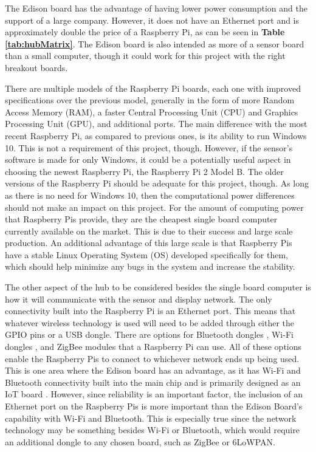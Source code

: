 \documentclass[PPFS.tex]{template/subfiles}
\begin{document}
The Edison board has the advantage of having lower power consumption and the support of a large company. However, it does not have an Ethernet port and is approximately double the price of a Raspberry Pi, as can be seen in \textbf{Table \ref{tab:hubMatrix}}. The Edison board is also intended as more of a sensor board than a small computer, though it could work for this project with the right breakout boards. \cite{Intel}

There are multiple models of the Raspberry Pi boards, each one with improved specifications over the previous model, generally in the form of more Random Access Memory (RAM), a faster Central Processing Unit (CPU) and Graphics Processing Unit (GPU), and additional ports. The main difference with the most recent Raspberry Pi, as compared to previous ones, is its ability to run Windows 10. This is not a requirement of this project, though. However, if the sensor's software is made for only Windows, it could be a potentially useful aspect in choosing the newest Raspberry Pi, the Raspberry Pi 2 Model B. The older versions of the Raspberry Pi should be adequate for this project, though. As long as there is no need for Windows 10, then the computational power differences should not make an impact on this project. For the amount of computing power that Raspberry Pis provide, they are the cheapest single board computer currently available on the market. This is due to their success and large scale production. An additional advantage of this large scale is that Raspberry Pis have a stable Linux Operating System (OS) developed specifically for them, which should help minimize any bugs in the system and increase the stability. \cite{RaspberryPi}

The other aspect of the hub to be considered besides the single board computer is how it will communicate with the sensor and display network. The only connectivity built into the Raspberry Pi is an Ethernet port. This means that whatever wireless technology is used will need to be added through either the GPIO pins or a USB dongle. There are options for Bluetooth dongles \cite{AdaFruit}, Wi-Fi dongles \cite{RaspberryPi}, and ZigBee modules \cite{Zigbee} that a Raspberry Pi can use. All of these options enable the Raspberry Pis to connect to whichever network ends up being used. This is one area where the Edison board has an advantage, as it has Wi-Fi and Bluetooth connectivity built into the main chip and is primarily designed as an IoT board \cite{Intel}. However, since reliability is an important factor, the inclusion of an Ethernet port on the Raspberry Pis is more important than the Edison Board's capability with Wi-Fi and Bluetooth. This is especially true since the network technology may be something besides Wi-Fi or Bluetooth, which would require an additional dongle to any chosen board, such as ZigBee or 6LoWPAN.
\end{document}
